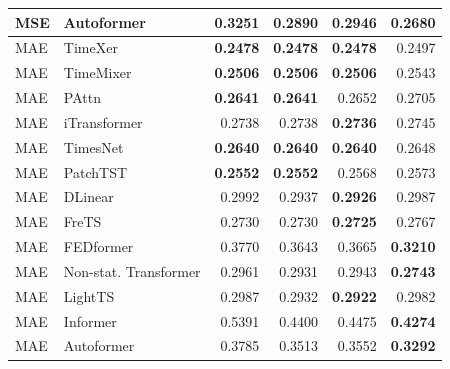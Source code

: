 \begin{longtable}{llrrrr}
MSE & Autoformer & 0.3251 & 0.2890 & 0.2946 & \textbf{0.2680} \\
\midrule
MAE & TimeXer & \textbf{0.2478} & \textbf{0.2478} & \textbf{0.2478} & 0.2497 \\
MAE & TimeMixer & \textbf{0.2506} & \textbf{0.2506} & \textbf{0.2506} & 0.2543 \\
MAE & PAttn & \textbf{0.2641} & \textbf{0.2641} & 0.2652 & 0.2705 \\
MAE & iTransformer & 0.2738 & 0.2738 & \textbf{0.2736} & 0.2745 \\
MAE & TimesNet & \textbf{0.2640} & \textbf{0.2640} & \textbf{0.2640} & 0.2648 \\
MAE & PatchTST & \textbf{0.2552} & \textbf{0.2552} & 0.2568 & 0.2573 \\
MAE & DLinear & 0.2992 & 0.2937 & \textbf{0.2926} & 0.2987 \\
MAE & FreTS & 0.2730 & 0.2730 & \textbf{0.2725} & 0.2767 \\
MAE & FEDformer & 0.3770 & 0.3643 & 0.3665 & \textbf{0.3210} \\
MAE & Non-stat. Transformer & 0.2961 & 0.2931 & 0.2943 & \textbf{0.2743} \\
MAE & LightTS & 0.2987 & 0.2932 & \textbf{0.2922} & 0.2982 \\
MAE & Informer & 0.5391 & 0.4400 & 0.4475 & \textbf{0.4274} \\
MAE & Autoformer & 0.3785 & 0.3513 & 0.3552 & \textbf{0.3292} \\
\end{longtable}
\endgroup

